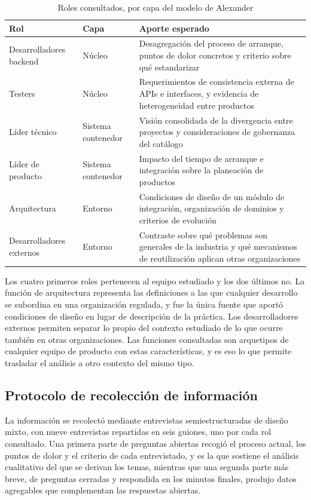 \begin{table}[H]
\centering
{\footnotesize
\begin{tabular}{p{3.2cm}p{2.6cm}p{9.4cm}}
\toprule
\textbf{Rol} & \textbf{Capa} & \textbf{Aporte esperado} \\
\midrule
Desarrolladores backend & Núcleo & Desagregación del proceso de arranque, puntos de dolor concretos y criterio sobre qué estandarizar \\
Testers & Núcleo & Requerimientos de consistencia externa de APIs e interfaces, y evidencia de heterogeneidad entre productos \\
Líder técnico & Sistema contenedor & Visión consolidada de la divergencia entre proyectos y consideraciones de gobernanza del catálogo \\
Líder de producto & Sistema contenedor & Impacto del tiempo de arranque e integración sobre la planeación de productos \\
Arquitectura & Entorno & Condiciones de diseño de un módulo de integración, organización de dominios y criterios de evolución \\
Desarrolladores externos & Entorno & Contraste sobre qué problemas son generales de la industria y qué mecanismos de reutilización aplican otras organizaciones \\
\bottomrule
\end{tabular}
}
\caption{Roles consultados, por capa del modelo de Alexander}
\label{tab:roles}
\end{table}

Los cuatro primeros roles pertenecen al equipo estudiado y los dos últimos no.
La función de arquitectura representa las definiciones a las que cualquier
desarrollo se subordina en una organización regulada, y fue la única fuente
que aportó condiciones de diseño en lugar de descripción de la práctica. Los
desarrolladores externos permiten separar lo propio del contexto estudiado de
lo que ocurre también en otras organizaciones. Las funciones consultadas son
arquetipos de cualquier equipo de producto con estas características, y es eso
lo que permite trasladar el análisis a otro contexto del mismo tipo.

\subsection{Protocolo de recolección de información}
\label{sec:protocolo}

La información se recolectó mediante entrevistas semiestructuradas de diseño
mixto, con nueve entrevistas repartidas en seis guiones, uno por cada rol
consultado. Una primera parte de preguntas abiertas recogió el proceso actual,
los puntos de dolor y el criterio de cada entrevistado, y es la que sostiene el
análisis cualitativo del que se derivan los temas, mientras que una segunda
parte más breve, de preguntas cerradas y respondida en los minutos finales,
produjo datos agregables que complementan las respuestas abiertas.

